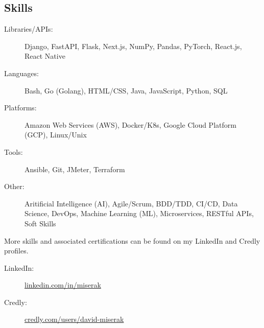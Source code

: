 \begin{samepage}
\section{Skills}
\label{sec:skills}

\begin{description}
	\item[Libraries/APIs:]
		Django,
		FastAPI,
		Flask,
		Next.js,
		NumPy,
		Pandas,
		PyTorch,
		React.js,
		React Native
	\item[Languages:]
		Bash,
		Go (Golang),
		HTML/CSS,
		Java,
		JavaScript,
		Python,
		SQL
	\item[Platforms:]
		Amazon Web Services (AWS),
		Docker/K8s,
		Google Cloud Platform (GCP),
		Linux/Unix
	\item[Tools:]
		Ansible,
		Git,
		JMeter,
		Terraform

	\item[Other:]
		Aritificial Intelligence (AI),
		Agile/Scrum,
		BDD/TDD,
		CI/CD,
		Data Science,
		DevOps,
		Machine Learning (ML),
		Microservices,
		RESTful APIs,
		Soft Skills\\
\end{description}
%
	More skills and associated certifications can be found on my LinkedIn and Credly profiles.
\begin{description}
	\item[LinkedIn:] \href{https://www.linkedin.com/in/miserak/}{linkedin.com/in/miserak}
	\item[Credly:] \href{https://www.credly.com/users/david-miserak}{credly.com/users/david-miserak}
\end{description}
\end{samepage}
